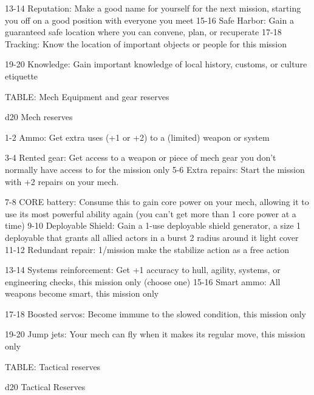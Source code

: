    13-14   Reputation: Make a good name for yourself for the next mission, starting you off on a
           good position with everyone you meet
   15-16   Safe Harbor: Gain a guaranteed safe location where you can convene, plan, or
           recuperate
   17-18   Tracking: Know the location of important objects or people for this mission

   19-20   Knowledge: Gain important knowledge of local history, customs, or culture etiquette

TABLE: Mech Equipment and gear reserves

 d20       Mech	reserves

  1-2      Ammo: Get extra uses (+1 or +2) to a (limited) weapon or system

  3-4      Rented gear: Get access to a weapon or piece of mech gear you don’t normally have
           access to for the mission only
  5-6      Extra repairs: Start the mission with +2 repairs on your mech.

  7-8      CORE battery: Consume this to gain core power on your mech, allowing it to use its
           most powerful ability again (you can’t get more than 1 core power at a time)
 9-10      Deployable Shield: Gain a 1-use deployable shield generator, a size 1 deployable that
           grants all allied actors in a burst 2 radius around it light cover
   11-12   Redundant repair: 1/mission make the stabilize action as a free action

   13-14   Systems reinforcement: Get +1 accuracy to hull, agility, systems, or engineering
           checks, this mission only (choose one)
   15-16   Smart ammo: All weapons become smart, this mission only

   17-18   Boosted servos: Become immune to the slowed condition, this mission only

   19-20   Jump jets: Your mech can fly when it makes its regular move, this mission only

TABLE: Tactical reserves




 d20       Tactical	Reserves

